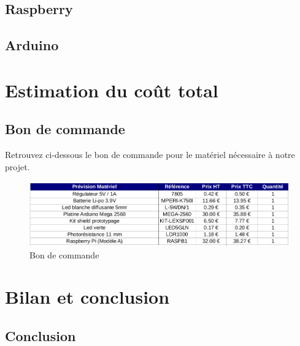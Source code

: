 \documentclass[12pt,titlepage,a4paper]{report}
\begin{document}
		\chapter{Raspberry}
		

		\chapter{Arduino}
		


	\part{Estimation du coût total}
		\chapter{Bon de commande}
		Retrouvez ci-dessous le bon de commande pour le matériel nécessaire à notre 	projet.
		\begin{figure}[H]
			\centering
			\includegraphics[width=550px]{images/lextronic.png}
			\caption{Bon de commande}
		\end{figure}


	\part{Bilan et conclusion}
		\chapter{Conclusion}
		
\end{document}
